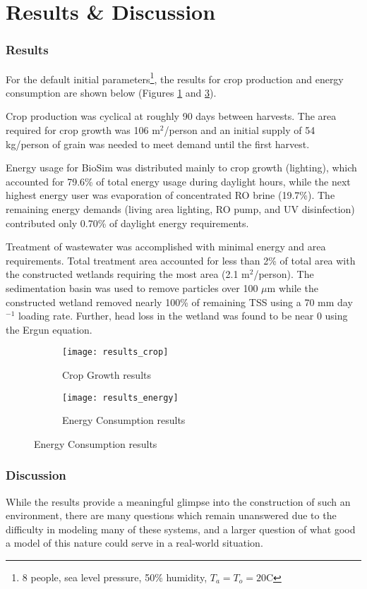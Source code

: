 \part{Results \& Discussion}
\section{Results}
For the default initial parameters\footnote{8 people, sea level pressure, 50\% humidity, $T_a=T_o=20$\degree C}, the results for crop production and energy consumption are shown below (Figures \ref{fig:results_crop} and \ref{fig:results_energy}). 

Crop production was cyclical at roughly 90 days between harvests. The area required for crop growth was 106 m$^2$/person and an initial supply of 54 kg/person of grain was needed to meet demand until the first harvest.

Energy usage for BioSim was distributed mainly to crop growth (lighting), which accounted for 79.6\% of total energy usage during daylight hours, while the next highest energy user was evaporation of concentrated RO brine (19.7\%). The remaining energy demands (living area lighting, RO pump, and UV disinfection) contributed only 0.70\% of daylight energy requirements.

Treatment of wastewater was accomplished with minimal energy and area requirements. Total treatment area accounted for less than 2\% of total area with the constructed wetlands requiring the most area (2.1 m$^2$/person). The sedimentation basin was used to remove particles over 100 $\mu$m while the constructed wetland removed nearly 100\% of remaining TSS using a 70 mm day$^{-1}$ loading rate. Further, head loss in the wetland was found to be near 0 using the Ergun equation.
\begin{figure}[h]
    \centering
    \begin{subfigure}[h]{.47\textwidth}
        \centering
        \texttt{[image: results\_crop]}
        \caption{Crop Growth results}
        \label{fig:results_crop}
    \end{subfigure}
    \hfill
    \begin{subfigure}[h]{.47\textwidth}
        \centering
        \texttt{[image: results\_energy]}
        \caption{Energy Consumption results}
        \label{fig:results_energy}
    \end{subfigure}
\end{figure}

\newpage
\section{Discussion}
While the results provide a meaningful glimpse into the construction of such an environment, there are many questions which remain unanswered due to the difficulty in modeling many of these systems, and a larger question of what good a model of this nature could serve in a real-world situation. 

